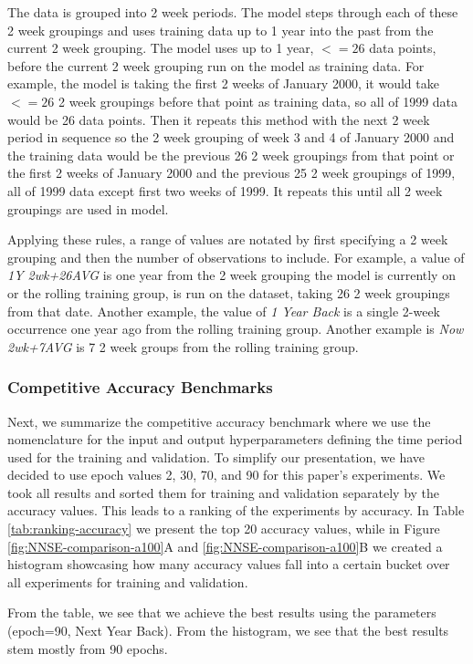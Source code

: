 \documentclass[utf8]{FrontiersinVancouver} %
\begin{document}
The data is grouped into 2 week periods. The model steps through each
of these 2 week groupings and uses training data up to 1 year into the
past from the current 2 week grouping. The model uses up to 1 year,
$<=26$ data points, before the current 2 week grouping run on the
model as training data. For example, the model is taking the first 2
weeks of January 2000, it would take $<=26$ 2 week groupings before
that point as training data, so all of 1999 data would be 26 data
points. Then it repeats this method with the next 2 week period in
sequence so the 2 week grouping of week 3 and 4 of January 2000 and
the training data would be the previous 26 2 week groupings from that
point or the first 2 weeks of January 2000 and the previous 25 2 week
groupings of 1999, all of 1999 data except first two weeks of 1999. It
repeats this until all 2 week groupings are used in model.

Applying these rules, a range of values are notated by first
specifying a 2 week grouping and then the number of observations to
include.  For example, a value of {\em 1Y 2wk+26AVG} is one year from
the 2 week grouping the model is currently on or the rolling training
group, is run on the dataset, taking 26 2 week groupings from that
date. Another example, the value of {\em 1 Year Back} is a single
2-week occurrence one year ago from the rolling training group.
Another example is {\em Now 2wk+7AVG} is 7 2 week groups from the
rolling training group.


\subsubsection{Competitive Accuracy Benchmarks}

Next, we summarize the competitive accuracy benchmark where we use the
nomenclature for the input and output hyperparameters defining the
time period used for the training and validation.  To simplify our
presentation, we have decided to use epoch values 2, 30, 70, and 90
for this paper's experiments. We took all results and sorted them for
training and validation separately by the accuracy values. This leads
to a ranking of the experiments by accuracy. In Table
\ref{tab:ranking-accuracy} we present the top 20 accuracy values,
while in Figure \ref{fig:NNSE-comparison-a100}A and
\ref{fig:NNSE-comparison-a100}B we created a histogram showcasing how
many accuracy values fall into a certain bucket over all experiments
for training and validation.

From the table, we see that we achieve the best results using the
parameters (epoch=90, Next Year Back). From the histogram, we see that
the best results stem mostly from 90 epochs.
\end{document}
